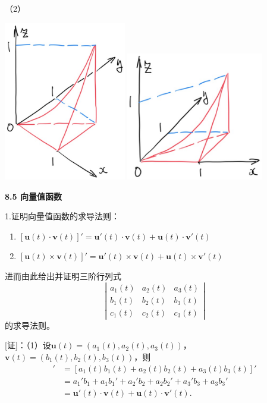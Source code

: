 （2）
\begin{center}
	\includegraphics[width=0.4\textwidth]{./images/ch8/3int-1.jpg}\quad\quad
	\includegraphics[width=0.45\textwidth]{./images/ch8/3int-2.jpg}
\end{center}

\bs

\begin{center}
	\bf 8.5 向量值函数
\end{center}

1.证明向量值函数的求导法则：
  \begin{enumerate}[(1)]
    \setlength{\itemindent}{1cm}
    \item $[\bm{u}(t)\cdot\bm{v}(t)]'
    =\bm{u}'(t)\cdot\bm{v}(t)+\bm{u}(t)\cdot\bm{v}'(t)$
    \item $[\bm{u}(t)\times\bm{v}(t)]'
    =\bm{u}'(t)\times\bm{v}(t)+\bm{u}(t)\times\bm{v}'(t)$ 
  \end{enumerate}
  进而由此给出并证明三阶行列式
  $$\left|\begin{array}{ccc}
  	a_1(t) & a_2(t) & a_3(t)\\
  	b_1(t) & b_2(t) & b_3(t)\\
  	c_1(t) & c_2(t) & c_3(t)
  \end{array}\right|$$
  的求导法则。	  

[证]：（1）设$\bm{u}(t)=(a_1(t),a_2(t),a_3(t))$，
$\bm{v}(t)=(b_1(t),b_2(t),b_3(t))$，则
\begin{align*}
	[\bm{u}(t)\cdot\bm{v}(t)]'
	&=[a_1(t)b_1(t)+a_2(t)b_2(t)+a_3(t)b_3(t)]'\\
	&=a_1'b_1+a_1b_1'+a_2'b_2+a_2b_2'+a_3'b_3+a_3b_3'\\
	&=\bm{u}'(t)\cdot\bm{v}(t)+\bm{u}(t)\cdot\bm{v}'(t).
\end{align*}

